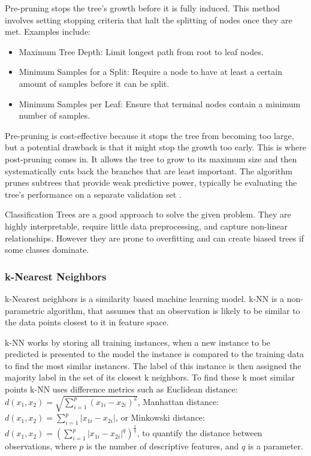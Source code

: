 \documentclass[conference]{IEEEtran}
\begin{document}
Pre-pruning stops the tree's growth before it is fully induced. This method involves setting stopping criteria that halt the splitting of nodes once they are met. Examples include:

\begin{itemize}
    \item Maximum Tree Depth: Limit longest path from root to leaf nodes.
    \item Minimum Samples for a Split: Require a node to have at least a certain amount of samples before it can be split.
    \item Minimum Samples per Leaf: Ensure that terminal nodes contain a minimum number of samples.
\end{itemize}

Pre-pruning is cost-effective because it stops the tree from becoming too large, but a potential drawback is that it might stop the growth too early. This is where post-pruning comes in. It allows the tree to grow to its maximum size and then systematically cuts back the branches that are least important. The algorithm prunes subtrees that provide weak predictive power, typically be evaluating the tree's performance on a separate validation set \cite{b1}.

Classification Trees are a good approach to solve the given problem. They are highly interpretable, require little data preprocessing, and capture non-linear relationships. However they are prone to overfitting and can create biased trees if some classes dominate.

\subsubsection{\textbf{k-Nearest Neighbors}}

k-Nearest neighbors is a similarity based machine learning model. k-NN is a non-parametric algorithm, that assumes that an observation is likely to be similar to the data points closest to it in feature space.

k-NN works by storing all training instances, when a new instance to be predicted is presented to the model the instance is compared to the training data to find the most similar instances. The label of this instance is then assigned the majority label in the set of its closest k neighbors. To find these k most similar points k-NN uses difference metrics such as Euclidean distance: $d(x_1, x_2) = \sqrt{\sum_{i=1}^{p} (x_{1i} - x_{2i})^2}$, Manhattan distance: $d(x_1, x_2) = \sum_{i=1}^{p} |x_{1i} - x_{2i}|$, or Minkowski distance: $d(x_1, x_2) = (\sum_{i=1}^{p} |x_{1i} - x_{2i}|^q)^\frac{1}{q}$, to quantify the distance between observations, where $p$ is the number of descriptive features, and $q$ is a parameter.
\end{document}
